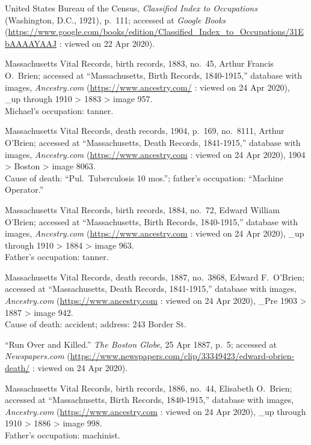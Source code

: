 \begin{thebibliography}{99}
	United States Bureau of the Census, \textit{Classified Index to Occupations} (Washington, D.C., 1921), p.\ 111; accessed at \textit{Google Books} (\url{https://www.google.com/books/edition/Classified_Index_to_Occupations/31EbAAAAYAAJ} : viewed on 22 Apr 2020).
	
	Massachusetts Vital Records, birth records, 1883, no.\ 45, Arthur Francis O.\ Brien; accessed at ``Massachusetts, Birth Records, 1840-1915,'' database with images, \textit{Ancestry.com} (\url{https://www.ancestry.com/} : viewed on 24 Apr 2020), \_up through 1910 > 1883 > image 957.\\
	Michael's occupation: tanner.
	
	Massachusetts Vital Records, death records, 1904, p.\ 169, no.\ 8111, Arthur O'Brien; accessed at ``Massachusetts, Death Records, 1841-1915,'' database with images, \textit{Ancestry.com} (\url{https://www.ancestry.com} : viewed on 24 Apr 2020), 1904 > Boston > image 8063.\\
	Cause of death: ``Pul.\ Tuberculosis 10 mos.''; father's occupation: ``Machine Operator.''
	
	Massachusetts Vital Records, birth records, 1884, no.\ 72, Edward William O'Brien; accessed at ``Massachusetts, Birth Records, 1840-1915,'' database with images, \textit{Ancestry.com} (\url{https://www.ancestry.com} : viewed on 24 Apr 2020), \_up through 1910 > 1884 > image 963.\\
	Father's occupation: tanner.
	
	Massachusetts Vital Records, death records, 1887, no.\ 3868, Edward F.\ O'Brien; accessed at ``Massachusetts, Death Records, 1841-1915,'' database with images, \textit{Ancestry.com} (\url{https://www.ancestry.com} : viewed on 24 Apr 2020), \_Pre 1903 > 1887 > image 942.\\
	Cause of death: accident; address: 243 Border St.
	
	``Run Over and Killed.'' \textit{The Boston Globe}, 25 Apr 1887, p.\ 5; accessed at \textit{Newspapers.com} (\url{https://www.newspapers.com/clip/33349423/edward-obrien-death/} : viewed on 24 Apr 2020).
	
	Massachusetts Vital Records, birth records, 1886, no.\ 44, Elisabeth O.\ Brien; accessed at ``Massachusetts, Birth Records, 1840-1915,'' database with images, \textit{Ancestry.com} (\url{https://www.ancestry.com} : viewed on 24 Apr 2020), \_up through 1910 > 1886 > image 998.\\
	Father's occupation: machinist.
	

\end{thebibliography}
